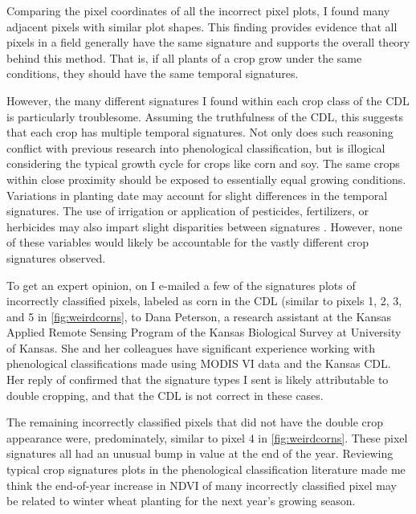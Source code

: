 Comparing the pixel coordinates of all the incorrect pixel plots, I found many adjacent pixels with similar plot shapes. This finding provides evidence that all pixels in a field generally have the same signature and supports the overall theory behind this method. That is, if all plants of a crop grow under the same conditions, they should have the same temporal signatures.

However, the many different signatures I found within each crop class of the CDL is particularly troublesome. Assuming the truthfulness of the CDL, this suggests that each crop has multiple temporal signatures. Not only does such reasoning conflict with previous research into phenological classification, but is illogical considering the typical growth cycle for crops like corn and soy. The same crops within close proximity should be exposed to essentially equal growing conditions. Variations in planting date may account for slight differences in the temporal signatures. The use of irrigation or application of pesticides, fertilizers, or herbicides may also impart slight disparities between signatures \autocites{wardlow2005state-level}{wardlow2007analysis}{wardlow2008large-area}{sakamoto2010a-two-step}. However, none of these variables would likely be accountable for the vastly different crop signatures observed.

To get an expert opinion, on  I e-mailed a few of the signatures plots of incorrectly classified pixels, labeled as corn in the CDL (similar to pixels 1, 2, 3, and 5 in \cref{fig:weirdcorns}, to Dana Peterson, a research assistant at the Kansas Applied Remote Sensing Program of the Kansas Biological Survey at University of Kansas. She and her colleagues have significant experience working with phenological classifications made using MODIS VI data and the Kansas CDL. Her reply of  confirmed that the signature types I sent is likely attributable to double cropping, and that the CDL is not correct in these cases.

The remaining incorrectly classified pixels that did not have the double crop appearance were, predominately, similar to pixel 4 in \cref{fig:weirdcorns}. These pixel signatures all had an unusual bump in value at the end of the year. Reviewing typical crop signatures plots in the phenological classification literature made me think the end-of-year increase in NDVI of many incorrectly classified pixel may be related to winter wheat planting for the next year’s growing season.

